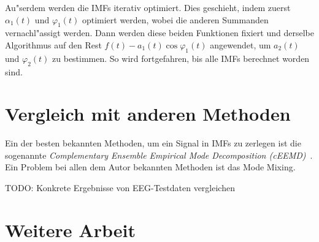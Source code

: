 \documentclass[a4paper]{scrartcl}
\newcommand{\pphi}{{\varphi}}
\newcommand{\todo}[1]{{TODO: {#1}}}
\begin{document}
Au"serdem werden die IMFs iterativ optimiert. 
Dies geschieht, indem zuerst $\alpha_1(t)$ und $\pphi_1(t)$ optimiert werden, wobei die anderen Summanden vernachl"assigt werden. 
Dann werden diese beiden Funktionen fixiert und derselbe Algorithmus auf den Rest $f(t) - a_1(t)\cos\pphi_1(t)$ angewendet, um $a_2(t)$ und $\pphi_2(t)$ zu bestimmen. 
So wird fortgefahren, bis alle IMFs berechnet worden sind. 

\section{Vergleich mit anderen Methoden}

Ein der besten bekannten Methoden, um ein Signal in IMFs zu zerlegen ist die sogenannte {\em Complementary Ensemble Empirical Mode Decomposition (cEEMD)}~\citep*{YeShHu2010}.
Ein Problem bei allen dem Autor bekannten Methoden ist das Mode Mixing. 

\todo{Konkrete Ergebnisse von EEG-Testdaten vergleichen}


\section{Weitere Arbeit} 
\end{document}
